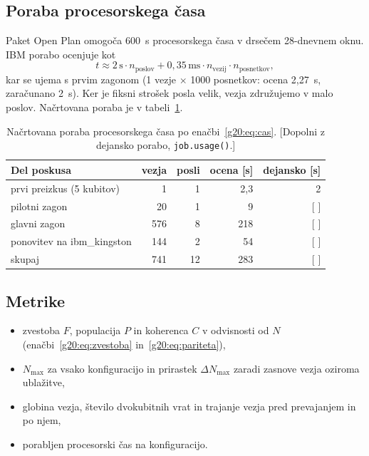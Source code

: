 \subsection{Poraba procesorskega časa}
\label{g20:sec:cas}

Paket Open Plan omogoča 600~s procesorskega časa v drsečem 28-dnevnem oknu. IBM porabo ocenjuje kot~\cite{g20:ibmjobtime}
\begin{equation}
t \approx 2\,\mathrm{s}\cdot n_\text{poslov} + 0{,}35\,\mathrm{ms}\cdot n_\text{vezij}\cdot n_\text{posnetkov},
\label{g20:eq:cas}
\end{equation}
kar se ujema s prvim zagonom (1 vezje $\times$ 1000 posnetkov: ocena 2,27~s, zaračunano 2~s). Ker je fiksni strošek posla
velik, vezja združujemo v malo poslov. Načrtovana poraba je v tabeli~\ref{g20:tab:cas}.

\begin{table}[htbp]
\caption{Načrtovana poraba procesorskega časa po enačbi~\eqref{g20:eq:cas}. [Dopolni z dejansko porabo, \texttt{job.usage()}.]}
\label{g20:tab:cas}
\centering
\begin{tabular}{lrrrr}
\toprule
Del poskusa & vezja & posli & ocena [s] & dejansko [s] \\
\midrule
prvi preizkus (5 kubitov) & 1 & 1 & 2,3 & 2 \\
pilotni zagon & 20 & 1 & 9 & [ ] \\
glavni zagon & 576 & 8 & 218 & [ ] \\
ponovitev na ibm\_kingston & 144 & 2 & 54 & [ ] \\
\midrule
skupaj & 741 & 12 & 283 & [ ] \\
\bottomrule
\end{tabular}
\end{table}

\subsection{Metrike}
\label{g20:sec:metrike}

\begin{itemize}
\item zvestoba $F$, populacija $P$ in koherenca $C$ v odvisnosti od $N$ (enačbi~\eqref{g20:eq:zvestoba} in~\eqref{g20:eq:pariteta}),
\item $N_{\max}$ za vsako konfiguracijo in prirastek $\Delta N_{\max}$ zaradi zasnove vezja oziroma ublažitve,
\item globina vezja, število dvokubitnih vrat in trajanje vezja pred prevajanjem in po njem,
\item porabljen procesorski čas na konfiguracijo.
\end{itemize}


